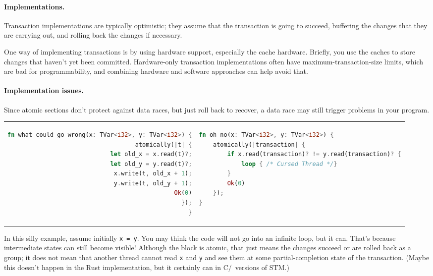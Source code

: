 \paragraph{Implementations.} Transaction implementations are typically 
optimistic; they assume that the transaction is going to succeed,
buffering the changes that they are carrying out, and rolling back the
changes if necessary.

One way of implementing transactions is by using hardware support,
especially the cache hardware. Briefly, you use the caches to store
changes that haven't yet been committed. Hardware-only transaction
implementations often have maximum-transaction-size limits, which are
bad for programmability, and combining hardware and software approaches
can help avoid that.

\paragraph{Implementation issues.} Since atomic sections don't protect
against data races, but just roll back to recover, a data race may still
trigger problems in your program.

\begin{tabular}{r|l}
\begin{minipage}{.46\textwidth}
\begin{lstlisting}[language=Rust]
fn what_could_go_wrong(x: TVar<i32>, y: TVar<i32>) {
    atomically(|t| {
        let old_x = x.read(t)?;
        let old_y = y.read(t)?;
        x.write(t, old_x + 1);
        y.write(t, old_y + 1);
        Ok(0)
    });
}
\end{lstlisting}
\end{minipage}
&
\begin{minipage}{.52\textwidth}
\begin{lstlisting}[language=Rust]
fn oh_no(x: TVar<i32>, y: TVar<i32>) {
    atomically(|transaction| {
        if x.read(transaction)? != y.read(transaction)? {
            loop { /* Cursed Thread */}
        }
        Ok(0)
    });
}
\end{lstlisting}
\end{minipage}
\end{tabular}

In this silly example, assume initially {\tt x = y}. You may think the
code will not go into an infinite loop, but it can. That's because intermediate states can still become visible! Although the block is atomic, that just means the changes succeed or are rolled back as a group; it does not mean that another thread cannot read \texttt{x} and \texttt{y} and see them at some partial-completion state of the transaction. (Maybe this doesn't happen in the Rust implementation, but it certainly can in C/\CPP~versions of STM.)





